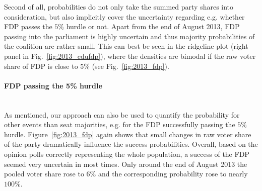 \documentclass[smallcondensed]{svjour3}     %
\begin{document}
Second of all, probabilities do not only take the summed party
shares into consideration, but also implicitly cover the 
uncertainty regarding e.g. whether FDP passes the $5\%$ hurdle
or not. Apart from the end of August 2013, FDP passing into the
parliament is highly uncertain and thus majority probabilities of
the coalition are rather small. This can best be seen in the
ridgeline plot (right panel in Fig.~\ref{fig:2013_cdufdp}), where
the densities are bimodal if the raw voter share of FDP is close
to $5\%$ (see Fig.~\ref{fig:2013_fdp}).


\paragraph{FDP passing the 5\% hurdle} \ \\
As mentioned, our approach can also be used to quantify the probability
for other events than seat majorities, e.g. for the FDP successfully
passing the $5\%$ hurdle. Figure~\ref{fig:2013_fdp} again shows that
small changes in raw voter share of the party dramatically influence
the success probabilities. Overall, based on the opinion polls
correctly representing the whole population, a success of the FDP seemed
very uncertain in most times. Only around the end of August 2013
the pooled voter share rose to $6\%$ and the corresponding probability
rose to nearly $100\%$.
\end{document}
